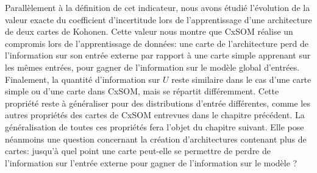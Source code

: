 Parallèlement à la définition de cet indicateur, nous avons étudié l'évolution de la valeur exacte du coefficient d'incertitude lors de l'apprentissage d'une architecture de deux cartes de Kohonen. Cette valeur nous montre que CxSOM réalise un compromis lors de l'apprentissage de données: une carte de l'architecture perd de l'information sur son entrée externe par rapport à une carte simple apprenant sur les mêmes entrées, pour gagner de l'information sur le modèle global d'entrées. Finalement, la quantité d'information sur $U$ reste similaire dans le cas d'une carte simple ou d'une carte dans CxSOM, mais se répartit différemment.
Cette propriété reste à généraliser pour des distributions d'entrée différentes, comme les autres propriétés des cartes de CxSOM entrevues dans le chapitre précédent. La généralisation de toutes ces propriétés fera l'objet du chapitre suivant.
Elle pose néanmoins une question concernant la création d'architectures contenant plus de cartes: jusqu'à quel point une carte peut-elle se permettre de perdre de l'information sur l'entrée externe pour gagner de l'information sur le modèle ? 




